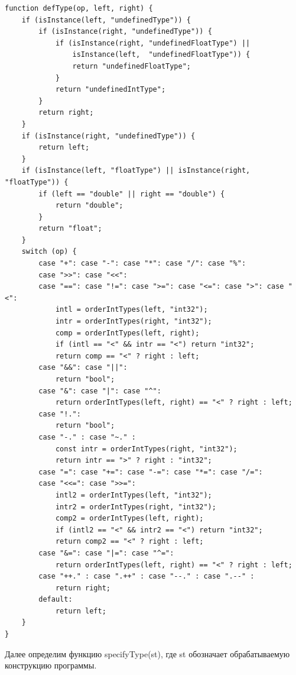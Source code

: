 \begin{lstlisting}
function defType(op, left, right) {
    if (isInstance(left, "undefinedType")) {
        if (isInstance(right, "undefinedType")) {
            if (isInstance(right, "undefinedFloatType") ||
                isInstance(left,  "undefinedFloatType")) {
                return "undefinedFloatType";
            }
            return "undefinedIntType";
        }
        return right;
    }
    if (isInstance(right, "undefinedType")) {
        return left;
    }
    if (isInstance(left, "floatType") || isInstance(right, "floatType")) {
        if (left == "double" || right == "double") {
            return "double";
        }
        return "float";
    }
    switch (op) {
        case "+": case "-": case "*": case "/": case "%":
        case ">>": case "<<":
        case "==": case "!=": case ">=": case "<=": case ">": case "<":
            intl = orderIntTypes(left, "int32");
            intr = orderIntTypes(right, "int32");
            comp = orderIntTypes(left, right);
            if (intl == "<" && intr == "<") return "int32";
            return comp == "<" ? right : left;
        case "&&": case "||":
            return "bool";
        case "&": case "|": case "^":
            return orderIntTypes(left, right) == "<" ? right : left;
        case "!.":
            return "bool";
        case "-." : case "~." :
            const intr = orderIntTypes(right, "int32");
            return intr == ">" ? right : "int32";
        case "=": case "+=": case "-=": case "*=": case "/=":
        case "<<=": case ">>=":
            intl2 = orderIntTypes(left, "int32");
            intr2 = orderIntTypes(right, "int32");
            comp2 = orderIntTypes(left, right);
            if (intl2 == "<" && intr2 == "<") return "int32";
            return comp2 == "<" ? right : left;
        case "&=": case "|=": case "^=":
            return orderIntTypes(left, right) == "<" ? right : left;
        case "++." : case ".++" : case "--." : case ".--" :
            return right;
        default:
            return left;
    }
}
\end{lstlisting}

Далее определим функцию specifyType(st), где st обозначает обрабатываемую конструкцию программы.


